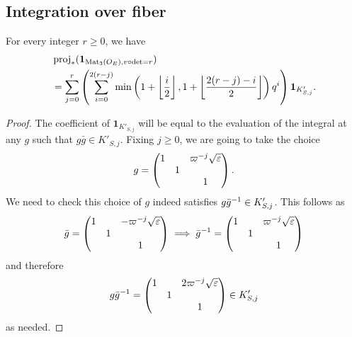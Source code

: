 \subsection{Integration over fiber}
\begin{proposition}
  For every integer $r \ge 0$, we have
  \begin{align*}
    &\operatorname{proj}_\ast(\mathbf{1}_{\operatorname{Mat}_3(O_E), v\circ\det=r}) \\
    &= \sum_{j=0}^r \left(
      \sum_{i=0}^{2(r-j)} \min \left( 1 + \left\lfloor \frac i2 \right\rfloor,
        1 + \left\lfloor \frac{2(r-j)-i}{2} \right\rfloor \right) q^i \right)
        \mathbf{1}_{K'_{S,j}}.
  \end{align*}
\end{proposition}
\begin{proof}
  The coefficient of $\mathbf{1}_{K'_{S,j}}$ will be equal to
  the evaluation of the integral at any $g$ such that $g\bar{g} \in K'_{S,j}$.
  Fixing $j \ge 0$, we are going to take the choice
  \[
    g = \begin{pmatrix}
      1 &   & \varpi^{-j} \sqrt{\varepsilon} \\
      & 1 \\
      &   & 1
    \end{pmatrix}.
  \]
  We need to check this choice of $g$ indeed satisfies $g\bar{g}^{-1} \in K'_{S,j}$.
  This follows as
  \[ \bar{g} = \begin{pmatrix} 1 &   & -\varpi^{-j} \sqrt{\varepsilon} \\ & 1 \\ &   & 1 \end{pmatrix}
    \implies \bar{g}^{-1} = \begin{pmatrix} 1 &   & \varpi^{-j} \sqrt{\varepsilon} \\ & 1 \\ &   & 1 \end{pmatrix}
  \]
  and therefore
  \[
    g\bar{g}^{-1} = \begin{pmatrix}
      1 &   & 2\varpi^{-j} \sqrt{\varepsilon} \\
      & 1 \\
      &   & 1
    \end{pmatrix} \in K'_{S,j}
  \]
  as needed.


\end{proof}
